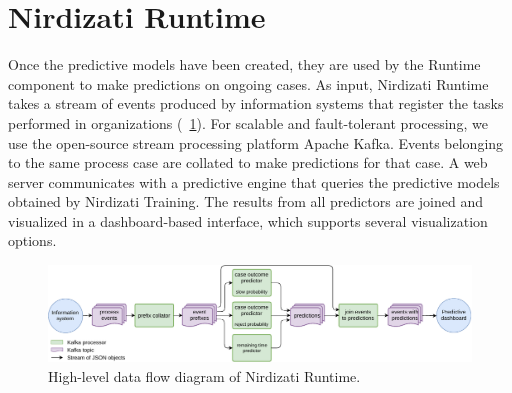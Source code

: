 \documentclass[runningheads,a4paper]{llncs}
\begin{document}



\section{Nirdizati Runtime} \label{sec:runtime}
Once the predictive models have been created, they are used by the Runtime component to make predictions on ongoing cases.
As input, Nirdizati Runtime takes a stream of events produced by information systems that register the tasks performed in organizations (\figurename~\ref{fig:dfd_0}).
For scalable and fault-tolerant processing, we use the open-source stream processing platform Apache Kafka.
Events belonging to the same process case are collated to make predictions for that case.
A web server communicates with a predictive engine that queries the predictive models obtained by Nirdizati Training.
The results from all predictors are joined and visualized in a dashboard-based interface, which supports several visualization options.

\begin{figure}[t]
	\centering
	\includegraphics[width=\textwidth]{img/nirdizati-dataflow}
	\caption{High-level data flow diagram of Nirdizati Runtime.}
	\label{fig:dfd_0}
\end{figure}
\end{document}
